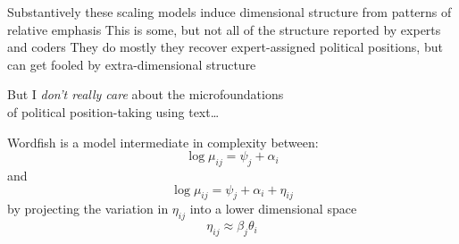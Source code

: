 \documentclass{mediumfoils}
\begin{document}
%
%
%
%
%
%
%
%
%
%
%
%
%

Substantively these scaling models induce dimensional structure from patterns of relative emphasis
\ita
\itm This is some, but not all of the structure reported by experts and coders
\itz
They do mostly they recover expert-assigned political positions, but can get fooled by extra-dimensional structure




\begin{center}
But I \textit{don't really care} about the microfoundations\\of political position-taking using text\ldots
\end{center}
\vfill


Wordfish is a model intermediate in complexity between:
\[
\log \mu_{ij} = \psi_{j} + \alpha_{i}
\]
and
\[
\log \mu_{ij} = \psi_{j} + \alpha_{i} + \eta_{ij} 
\]
by projecting the variation in $\eta_{ij}$ into a lower dimensional space
\[
\eta_{ij} \approx \beta_{j}\theta_{i}   
\]
\end{document}
